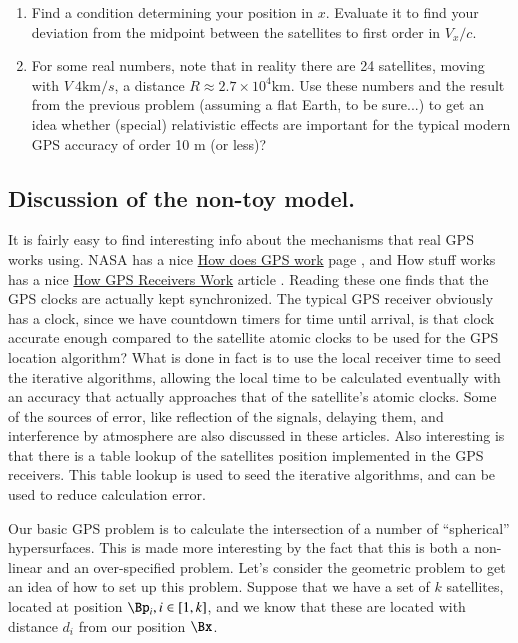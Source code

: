 \begin{enumerate}
\item  Find a condition determining your position in $x$.  Evaluate it to find your deviation from the midpoint between the satellites to first order in $V_x/c$.
\item For some real numbers, note that in reality there are 24 satellites, moving with $V ~4 \text{km}/s$, a distance $R \approx 2.7 \times 10^4 \text{km}$.  Use these numbers and the result from the previous problem (assuming a flat Earth, to be sure...) to get an idea whether (special) relativistic effects are important for the typical modern GPS accuracy of order 10 m (or less)?
\end{enumerate}

\subsection{Discussion of the non-toy model.}

It is fairly easy to find interesting info about the mechanisms that real GPS works using.  NASA has a nice \href{http://www.nasm.si.edu/gps/work.html}{How does GPS work} page \citep{nasaGPS}, and How stuff works has a nice \href{http://electronics.howstuffworks.com/gadgets/travel/gps.htm}{How GPS Receivers Work} article \citep{howStuffWorksGPS}.  Reading these one finds that the GPS clocks are actually kept synchronized.  The typical GPS receiver obviously has a clock, since we have countdown timers for time until arrival, is that clock accurate enough compared to the satellite atomic clocks to be used for the GPS location algorithm?  What is done in fact is to use the local receiver time to seed the iterative algorithms, allowing the local time to be calculated eventually with an accuracy that actually approaches that of the satellite's atomic clocks.  Some of the sources of error, like reflection of the signals, delaying them, and interference by atmosphere are also discussed in these articles.  Also interesting is that there is a table lookup of the satellites position implemented in the GPS receivers.  This table lookup is used to seed the iterative algorithms, and can be used to reduce calculation error.

Our basic GPS problem is to calculate the intersection of a number of ``spherical'' hypersurfaces.  This is made more interesting by the fact that this is both a non-linear and an over-specified problem.  Let's consider the geometric problem to get an idea of how to set up this problem.  Suppose that we have a set of $k$ satellites, located at position $\Bp_i, i \in [1,k]$, and we know that these are located with distance $d_i$ from our position $\Bx$.

